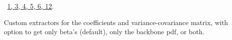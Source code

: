 \documentclass[reqno]{amsart}
\renewcommand{\NWlink}[2]{\hyperlink{#1}{#2}}
\begin{document}
\begin{flushleft}
\begin{list}{}{}
\mbox{}\verb@        q0 <- x$f0@\\
\mbox{}\verb@         print.default(format(q0, digits = digits),@\\
\mbox{}\verb@            print.gap = 2, quote = FALSE)@\\
\mbox{}\verb@    }@\\
\mbox{}\verb@    else cat("No baseline joint probabilities\n")@\\
\mbox{}\verb@@\\
\mbox{}\verb@   cat("\n Log-likelihood: ", format(x$loglik, digits=digits), "\n")@\\
\mbox{}\verb@   invisible(x)@\\
\mbox{}\verb@}@\\
\mbox{}\verb@@{\NWsep}
\end{list}
\vspace{-1.5ex}
\footnotesize
\begin{list}{}{\setlength{\itemsep}{-\parsep}\setlength{\itemindent}{-\leftmargin}}
\item \NWtxtFileDefBy\ \NWlink{nuweb1}{1}\NWlink{nuweb3}{, 3}\NWlink{nuweb4}{, 4}\NWlink{nuweb5}{, 5}\NWlink{nuweb6}{, 6}\NWlink{nuweb12}{, 12}.

\item{}
\end{list}
\vspace{4ex}
\end{flushleft}
Custom extractors for the coefficients and variance-covariance matrix, with option to get only beta's (default), only the backbone pdf, or both.
\end{document}
